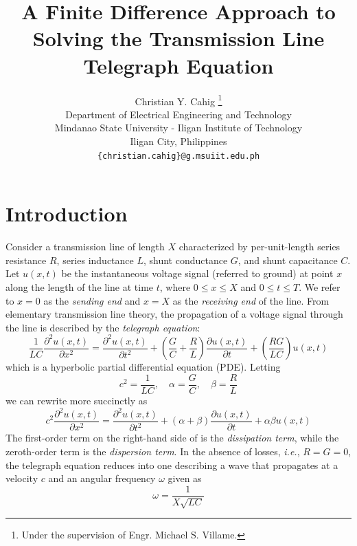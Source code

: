 \documentclass{article}
\title{A Finite Difference Approach to Solving the Transmission Line Telegraph Equation}
\author{Christian Y. Cahig
	\thanks{Under the supervision of Engr. Michael S. Villame.} \\
	Department of Electrical Engineering and Technology\\
	Mindanao State University - Iligan Institute of Technology\\
	Iligan City, Philippines \\
	\texttt{\{christian.cahig\}@g.msuiit.edu.ph} \\
}
\begin{document}
\maketitle

\begin{abstract}
\lipsum[4]
\end{abstract}

\section{Introduction}
\label{sec: Introduction}

Consider a transmission line of length $X$ characterized by per-unit-length
series resistance $R$,
series inductance $L$,
shunt conductance $G$,
and
shunt capacitance $C$.
Let $u \left(x,t\right)$ be the instantaneous voltage signal (referred to ground)
at point $x$ along the length of the line at time $t$,
where $0 \leq x \leq X$ and $0 \leq t \leq T$.
We refer to $x = 0$ as the \textit{sending end} and $x=X$ as the \textit{receiving end} of the line.
From elementary transmission line theory,
the propagation of a voltage signal through the line is described by the \textit{telegraph equation}:
\begin{equation}
   \label{eqn: Telegraph eqn full}
   \frac{1}{LC} \frac{\partial^{2} u \left(x,t\right)}{\partial x^{2}}
   =
   \frac{\partial^{2} u \left(x,t\right)}{\partial t^{2}}
   +
   \left(\frac{G}{C} + \frac{R}{L}\right) \frac{\partial u \left(x,t\right)}{\partial t}
   +
   \left(\frac{RG}{LC}\right) u \left(x,t\right)
\end{equation}
which is a hyperbolic partial differential equation (PDE).
Letting
\begin{equation*}
   c^{2} = \frac{1}{LC}, \quad \alpha = \frac{G}{C}, \quad \beta = \frac{R}{L}
\end{equation*}
we can rewrite  more succinctly as
\begin{equation}
   \label{eqn: Telegraph eqn short}
   c^{2} \frac{\partial^{2} u \left(x,t\right)}{\partial x^{2}}
   =
   \frac{\partial^{2} u \left(x,t\right)}{\partial t^{2}}
   +
   \left(\alpha + \beta\right) \frac{\partial u \left(x,t\right)}{\partial t}
   +
   \alpha \beta u \left(x,t\right)
\end{equation}
The first-order term on the right-hand side of  is the \textit{dissipation term},
while the zeroth-order term is the \textit{dispersion term}.
In the absence of losses, \textit{i.e.}, $R=G=0$, the telegraph equation reduces into one describing a wave
that propagates at a velocity $c$ and an angular frequency $\omega$ given as
\begin{equation}
   \label{eqn: Omega}
   \omega = \frac{1}{X \sqrt{LC}}
\end{equation}
\end{document}
